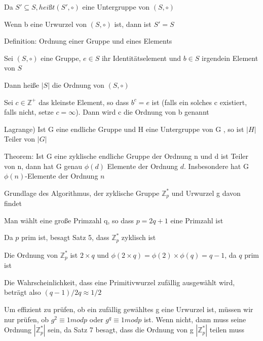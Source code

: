 \documentclass[a4paper]{article}
\begin{document}
\begin{multicols}{3}
\begin{itemize*}
            \begin{itemize*}
                  \item Da $S'\subseteq S, heißt (S',\circ)$ eine Untergruppe von $(S,\circ)$
                  \item Wenn b eine Urwurzel von $(S,\circ)$ ist, dann ist $S'=S$
            \end{itemize*}
            \item Definition: Ordnung einer Gruppe und eines Elements
            \begin{itemize*}
                  \item Sei $(S,\circ)$ eine Gruppe, $e\in S$ ihr Identitätselement und $b\in S$ irgendein Element von $S$
                  \item Dann heiße $| S|$ die Ordnung von $(S,\circ)$
                  \item Sei $c\in\mathbb{Z}^+$ das kleinste Element, so dass $b^c=e$ ist (falls ein solches c existiert, falls nicht, setze $c=\infty$). Dann wird c die Ordnung von b genannt
            \end{itemize*}
            \item Lagrange) Ist G eine endliche Gruppe und H eine Untergruppe von G , so ist $| H|$ Teiler von $|G|$
            \item Theorem: Ist G eine zyklische endliche Gruppe der Ordnung n und d ist Teiler von n, dann hat G genau $\phi(d)$ Elemente der Ordnung $d$. Insbesondere hat G $\phi(n)$-Elemente der Ordnung $n$
            \item Grundlage des Algorithmus, der zyklische Gruppe $\mathbb{Z}^*_p$ und Urwurzel g davon findet
            \begin{itemize*}
                  \item Man wählt eine große Primzahl q, so dass $p=2q+1$ eine Primzahl ist
                  \item Da $p$ prim ist, besagt Satz 5, dass $\mathbb{Z}^*_p$ zyklisch ist
                  \item Die Ordnung von $\mathbb{Z}^*_p$ ist $2\times q$ und $\phi(2\times q)=\phi(2)\times \phi(q)=q-1$, da $q$ prim ist
                  \item Die Wahrscheinlichkeit, dass eine Primitivwurzel zufällig ausgewählt wird, beträgt also $(q-1)/2q \approx 1/2$
                  \item Um effizient zu prüfen, ob ein zufällig gewähltes g eine Urwurzel ist, müssen wir nur prüfen, ob $g^2\equiv 1 mod p$ oder $g^q\equiv 1 mod p$ ist. Wenn nicht, dann muss seine Ordnung $|\mathbb{Z}^*_p|$ sein, da Satz 7 besagt, dass die Ordnung von g $|\mathbb{Z}^*_p|$ teilen muss

\end{itemize*}
\end{itemize*}
\end{multicols}
\end{document}
